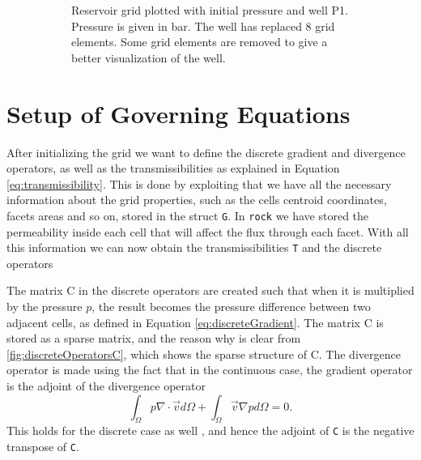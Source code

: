 \begin{figure}[H]
\begin{subfigure}[t]{0.48\textwidth}
        \caption{Reservoir grid plotted with initial pressure and well P1. Pressure is given in bar. The well has replaced 8 grid elements. Some grid elements are removed to give a better visualization of the well.}
        \label{fig:flowSolverGridWithWell}
    \end{subfigure}
    \caption{}
\end{figure}

\section{Setup of Governing Equations}
After initializing the grid we want to define the discrete gradient and divergence operators, as well as the transmissibilities as explained in Equation \eqref{eq:transmissibility}. This is done by exploiting that we have all the necessary information about the grid properties, such as the cells centroid coordinates, facets areas and so on, stored in the struct \texttt{G}. In \texttt{rock} we have stored the permeability inside each cell that will affect the flux through each facet. With all this information we can now obtain the transmissibilities \texttt{T} and the discrete operators


The matrix C in the discrete operators are created such that when it is multiplied by the pressure $p$, the result becomes the pressure difference between two adjacent cells, as defined in Equation \eqref{eq:discreteGradient}. The matrix C is stored as a sparse matrix, and the reason why is clear from \autoref{fig:discreteOperatorsC}, which shows the sparse  structure of C. The divergence operator is made using the fact that in the continuous case, the gradient operator is the adjoint of the divergence operator
\begin{equation*}
    \int_\Omega p\nabla \cdot \vec{v} d\Omega + \int_\Omega \vec{v}\nabla p d\Omega = 0.
\end{equation*}
This holds for the discrete case as well \emph{\citep{lieMrstUrl}}, and hence the adjoint of \texttt{C} is the negative transpose of \texttt{C}.

